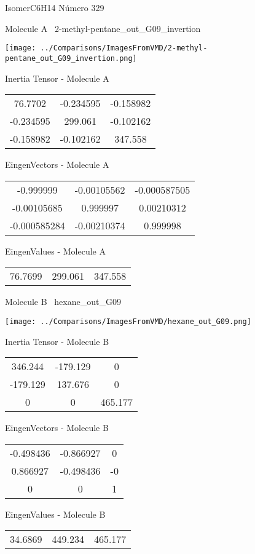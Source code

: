 \vtab[-3cm]
\begin{center}
{\large IsomerC6H14 \tab Número 329}
\end{center}
\begin{multicols}{2}
\begin{center}

Molecule A \
2-methyl-pentane\_out\_G09\_invertion

\texttt{[image: ../Comparisons/ImagesFromVMD/2-methyl-pentane\_out\_G09\_invertion.png]}

Inertia Tensor - Molecule A \\
\begin{tabular}{|c c c|}
76.7702	 & 	-0.234595	 & 	-0.158982	 \\
-0.234595	 & 	299.061	 & 	-0.102162	 \\
-0.158982	 & 	-0.102162	 & 	347.558
\end{tabular}

\vtab
 EingenVectors - Molecule A     \\
\begin{tabular}{|c c c|}
-0.999999	 & 	-0.00105562	 & 	-0.000587505	 \\
-0.00105685	 & 	0.999997	 & 	0.00210312	 \\
-0.000585284	 & 	-0.00210374	 & 	0.999998
\end{tabular}

\vtab
 EingenValues - Molecule A     \\
\begin{tabular}{|c c c|}
76.7699	 & 	299.061	 & 	347.558	 \\
\end{tabular}
\columnbreak

Molecule B \
hexane\_out\_G09

\texttt{[image: ../Comparisons/ImagesFromVMD/hexane\_out\_G09.png]}

Inertia Tensor - Molecule B \\
\begin{tabular}{|c c c|}
346.244	 & 	-179.129	 & 	0	 \\
-179.129	 & 	137.676	 & 	0	 \\
0	 & 	0	 & 	465.177
\end{tabular}

\vtab
 EingenVectors - Molecule B     \\
\begin{tabular}{|c c c|}
-0.498436	 & 	-0.866927	 & 	0	 \\
0.866927	 & 	-0.498436	 & 	-0	 \\
0	 & 	0	 & 	1
\end{tabular}

\vtab
 EingenValues - Molecule B     \\
\begin{tabular}{|c c c|}
34.6869	 & 	449.234	 & 	465.177	 \\
\end{tabular}

\end{center}
\end{multicols}

